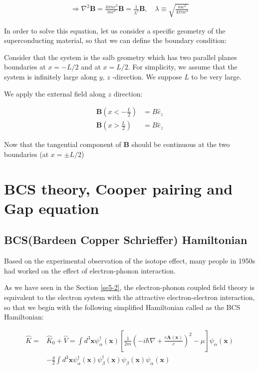 \begin{align} \tag{A}
\Rightarrow \nabla^2 \bm{B} = \frac{4\pi ne^2}{mc^2}\bm{B} = \frac{1}{\lambda^2}\bm{B},\quad \lambda \equiv \sqrt{\frac{mc^2}{4\pi ne^2}} 
\end{align}

In order to solve this equation, let us consider a specific geometry of the superconducting material, so that we can define the boundary condition: 

Consider that the system is the salb geometry which has two parallel planes boundaries at $x = -L/2$ and at $x = L/2$. For simplicity, we assume that the system is infinitely large along $y,\, z$ -direction. We suppose $L$ to be very large. 

We apply the external field along $z$ direction: 

\[\begin{split}
\bm B\left(x < -\frac{L}{2}\right) &= B\hat{e}_z\\
\bm B\left(x > \frac{L}{2}\right) &= B\hat{e}_z
\end{split} \]

Now that the tangential component of $\bm{B}$ should be continuous at the two boundaries (at $x = \pm L/2$)







\section{BCS theory, Cooper pairing and Gap equation}

\subsection{BCS(Bardeen Copper Schrieffer) Hamiltonian}



Based on the experimental observation of the isotope effect, many people in 1950s had worked on the effect of electron-phonon interaction. 

As we have seen in the Section {\ref{se5-2}}, the electron-phonon coupled field theory is equivalent to the electron system with the attractive electron-electron interaction, so that we begin with the following simplified Hamiltonian called as the BCS Hamiltonian: 

\[\begin{split}
\hat{K} =& \hat{K}_0 + \hat{V} = \int d^3 \bm{x} \psi^{\dagger}_{\alpha}(\bm{x})\left[\frac{1}{2m}\left(-i\hbar \nabla + \frac{e\bm{A}(\bm{x})}{c}\right)^2-\mu\right]\psi_{\alpha}(\bm{x})\\
&-\frac{g}{2}\int d^3\bm{x}\psi^{\dagger}_{\alpha}(\bm{x})\psi^{\dagger}_{\beta}(\bm{x})\psi_{\beta}(\bm{x})\psi_{\alpha}(\bm{x})
\end{split} \]

